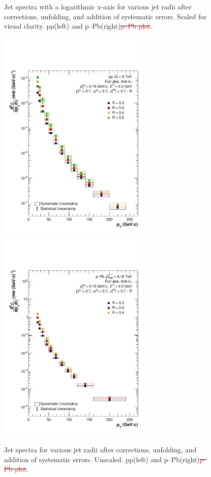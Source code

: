 \documentclass[ALICE]{ALICE_analysis_notes}
\newcommand{\pPb}{{\mbox{p--Pb}}\xspace}
\newcommand{\pp}{pp\xspace}
\providecommand{\DIFdeltex}[1]{{\protect\color{red}\sout{#1}}}                      %
\providecommand{\DIFdelFL}[1]{\DIFdel{#1}} %
\providecommand{\DIFaddbeginFL}{} %
\providecommand{\DIFaddendFL}{} %
\providecommand{\DIFdelbeginFL}{} %
\providecommand{\DIFdelendFL}{} %
\providecommand{\DIFdel}[1]{\texorpdfstring{\DIFdeltex{#1}}{}} %
\newcommand{\DIFscaledelfig}{0.5}
\newlength{\DIFdelgraphicswidth} %
\newlength{\DIFdelgraphicsheight} %
\newcommand{\DIFaddincludegraphics}[2][]{{\color{blue}\fbox{\DIFOincludegraphics[#1]{#2}}}} %
\newcommand{\DIFdelincludegraphics}[2][]{%
\sbox{\DIFdelgraphicsbox}{\DIFOincludegraphics[#1]{#2}}%
\settoboxwidth{\DIFdelgraphicswidth}{\DIFdelgraphicsbox} %
\settoboxtotalheight{\DIFdelgraphicsheight}{\DIFdelgraphicsbox} %
\scalebox{\DIFscaledelfig}{%
\parbox[b]{\DIFdelgraphicswidth}{\usebox{\DIFdelgraphicsbox}\\[-\baselineskip] \rule{\DIFdelgraphicswidth}{0em}}\llap{\resizebox{\DIFdelgraphicswidth}{\DIFdelgraphicsheight}{%
\setlength{\unitlength}{\DIFdelgraphicswidth}%
\begin{picture}(1,1)%
\thicklines\linethickness{2pt} %
{\color[rgb]{1,0,0}\put(0,0){\framebox(1,1){}}}%
{\color[rgb]{1,0,0}\put(0,0){\line( 1,1){1}}}%
{\color[rgb]{1,0,0}\put(0,1){\line(1,-1){1}}}%
\end{picture}%
}\hspace*{3pt}}} %
} %
\DeclareRobustCommand{\DIFaddbeginFL}{\DIFOaddbeginFL \let\includegraphics\DIFaddincludegraphics} %
\DeclareRobustCommand{\DIFaddendFL}{\DIFOaddendFL \let\includegraphics\DIFOincludegraphics} %
\DeclareRobustCommand{\DIFdelbeginFL}{\DIFOdelbeginFL \let\includegraphics\DIFdelincludegraphics} %
\DeclareRobustCommand{\DIFdelendFL}{\DIFOaddendFL \let\includegraphics\DIFOincludegraphics} %
\begin{document}
\begin{figure}
    \DIFaddendFL \caption{Jet spectra with a logarithmic x-axis for various jet radii after corrections, unfolding, and addition of systematic errors. Scaled for visual clarity. \pp (left) and \pPb (right)\DIFdelbeginFL \DIFdelFL{\textcolor{red}{\pPb plot}}\DIFdelendFL .}
    \label{fig:finalSpectraLogX}
\end{figure}

\begin{figure}
    \centering
    \DIFdelbeginFL %
\DIFdelendFL \DIFaddbeginFL \includegraphics[width=7.5cm]{figures/FinalResults/Bayes_reg6_unscaled.pdf}
    \includegraphics[width=7.5cm]{figures/pPbFigures/FinalResults/Bayes_reg6_unscaled.pdf}
    \DIFaddendFL \caption{Jet spectra for various jet radii after corrections, unfolding, and addition of systematic errors. Unscaled. \pp (left) and \pPb (right)\DIFdelbeginFL \DIFdelFL{\textcolor{red}{\pPb plot}}\DIFdelendFL .}
    \label{fig:finalSpectraUnscaled}
\end{figure}
\end{document}
